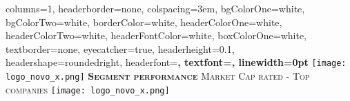 \documentclass[portrait, a4paper, fontscale=1.5, margin=2em]{baposter} %
\begin{document}
\begin{poster}
{
columns=1,
headerborder=none, %
colspacing=3em, %
bgColorOne=white, %
bgColorTwo=white, %
borderColor=white, %
headerColorOne=white, %
headerColorTwo=white, %
headerFontColor=white, %
boxColorOne=white, %
textborder=none, %
eyecatcher=true, %
headerheight=0.1\textheight, %
headershape=roundedright, %
headerfont=\Large\bf\textsc, %
textfont=\Large,
linewidth=0pt %
}
%
{\texttt{[image: logo\_novo\_x.png]}} %
{\bf\textsc{Segment performance}\vspace{0.6em}} %
{\textsc{ Market Cap rated \hspace{0.3em}-\hspace{0.3em} Top  companies}} %
{\texttt{[image: logo\_novo\_x.png]}} %





\end{poster}
\end{document}
